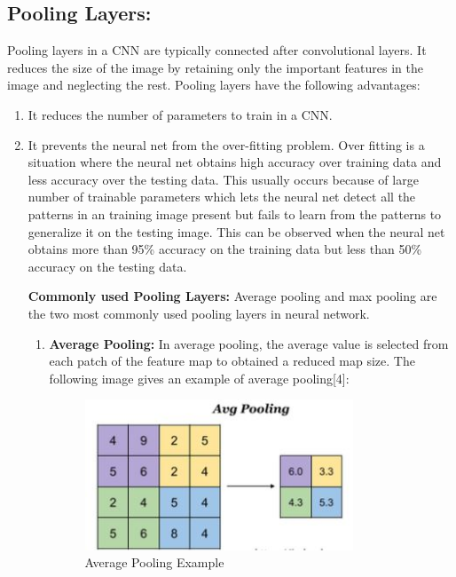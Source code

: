 \documentclass{IEEEtran}
\begin{document}
\subsection{\textbf{Pooling Layers:}}
Pooling layers in a CNN are typically connected after convolutional layers. It reduces the size of the image by retaining only the important features in the image and neglecting the rest. Pooling layers have the following advantages:
\begin{enumerate}
\item It reduces the number of parameters to train in a CNN.

\item It prevents the neural net from the over-fitting problem. Over fitting is a situation where the neural net obtains high accuracy over training data and less accuracy over the testing data. This usually occurs because of large number of trainable parameters which lets the neural net detect all the patterns in an training image present but fails to learn from the patterns to generalize it on the testing image. This can be observed when the neural net obtains more than 95\% accuracy on the training data but less than 50\% accuracy on the testing data.
\newline

\textbf{Commonly used Pooling Layers:} Average pooling and max pooling are the two most commonly used pooling layers in neural network.
\begin{enumerate}
\item \textbf{Average Pooling:} In average pooling, the average value is selected from each patch of the feature map to obtained a reduced map size. The following image gives an example of average pooling[4]:

\begin{figure}[h]
    \centering
    \captionsetup{justification=centering}
    \includegraphics[width=8cm]{avgpool}
    \caption{Average Pooling Example}
    \label{fig:Average Pooling Example}
\end{figure}


\end{enumerate}
\end{enumerate}
\end{document}

